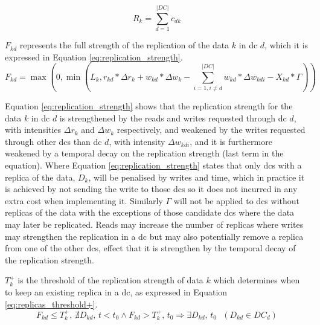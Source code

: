 \documentclass[english]{article}
\begin{document}
\begin{equation} \label{eq:num_replicas}
R_{k} = \sum^{|DC|}_{d = 1} c_{dk}
\end{equation}

$F_{kd}$ represents the full strength of the replication of the data $k$ in \gls{dc} $d$, which it is expressed in Equation \ref{eq:replication_strength}.
\begin{equation}  \label{eq:replication_strength}
	 F_{kd} = \max(0, \min(L_{k}, r_{kd} * \Delta r_{k} + w_{kd} * \Delta w_{k} - \sum^{|DC|}_{i = 1, i \neq d} w_{kd} * \Delta w_{kdi} - X_{kd} * \Gamma))
\end{equation}


Equation \ref{eq:replication_strength} shows that the replication strength for the data $k$ in \gls{dc} $d$ is strengthened by the reads and writes requested through \gls{dc} $d$, with intensities $\Delta r_{k}$ and $\Delta w_{k}$ respectively, and weakened  by the writes requested through other \glspl{dc} than \gls{dc} $d$, with intensity $\Delta w_{kdi}$, and it is furthermore weakened by a temporal decay on the replication strength (last term in the equation). Where Equation \ref{eq:replication_strength} states that only \glspl{dc} with a replica of the data, $D_{k}$, will be penalised by writes and time, which in practice it is achieved by not sending the write to those \glspl{dc} so it does not incurred in any extra cost when implementing it. Similarly $\Gamma$ will not be applied to \glspl{dc} without replicas of the data with the exceptions of those candidate \glspl{dc} where the data may later be replicated. Reads may increase the number of replicas where writes may strengthen the replication in a \gls{dc} but may also potentially remove a replica from one of the other \glspl{dc}, effect that it is strengthen by the temporal decay of the replication strength.

$T^{+}_{k}$ is the threshold of the replication strength of data $k$ which determines when to keep an existing replica in a \gls{dc}, as expressed in Equation \ref{eq:replicas_threshold+}.
\begin{equation} \label{eq:replicas_threshold+}
	F_{kd} \le T^{+}_{k} \text{, } \nexists D_{kd} \text{, } t < t_{0}  \wedge F_{kd} > T^{+}_{k} \text{, } t_{0} \Longrightarrow \exists D_{kd} \text{, } t_{0} \text{ } (D_{kd} \in DC_{d})
\end{equation}
\end{document}
